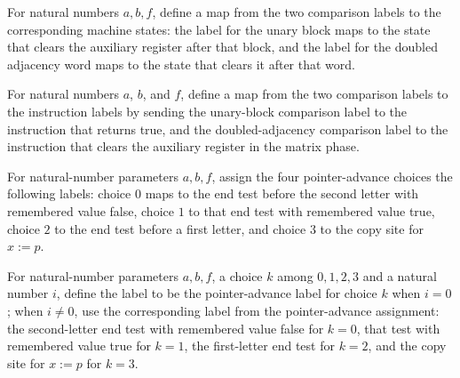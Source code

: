 \begin{definition}
\label{Complexity.PathHard.leYes}
\leanok
{}
For natural numbers $a,b,f$, define a map from the two comparison labels to the
corresponding machine states: the label for the unary block maps to the state that
clears the auxiliary register after that block, and the label for the doubled adjacency
word maps to the state that clears it after that word.
\end{definition}

\begin{definition}
\label{Complexity.PathHard.leNo}
\leanok
{}
For natural numbers $a$, $b$, and $f$, define a map from the two comparison labels to
the instruction labels by sending the unary-block comparison label to the instruction
that returns true, and the doubled-adjacency comparison label to the instruction that
clears the auxiliary register in the matrix phase.
\end{definition}

\begin{definition}
\label{Complexity.PathHard.advT}
\leanok
{}
For natural-number parameters $a,b,f$, assign the four pointer-advance choices the
following labels: choice $0$ maps to the end test before the second letter with
remembered value false, choice $1$ to that end test with remembered value true, choice
$2$ to the end test before a first letter, and choice $3$ to the copy site for $x:=p$.
\end{definition}

\begin{definition}
\label{Complexity.PathHard.advF}
\leanok
{}
For natural-number parameters $a,b,f$, a choice $k$ among $0,1,2,3$ and a natural number
$i$, define the label to be the pointer-advance label for choice $k$ when $i=0$; when
$i\ne0$, use the corresponding label from the pointer-advance assignment: the
second-letter end test with remembered value false for $k=0$, that test with remembered
value true for $k=1$, the first-letter end test for $k=2$, and the copy site for $x:=p$
for $k=3$.
\end{definition}

